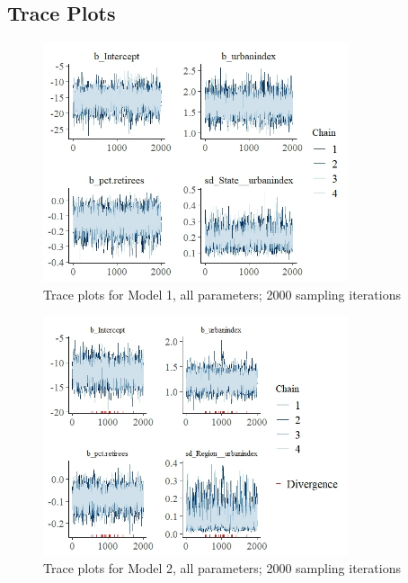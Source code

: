 \documentclass[12pt]{article}
\begin{document}
\clearpage
\FloatBarrier
\subsection*{Trace Plots}

%

\begin{figure}[h!]
	\centering
	\caption{Trace plots for Model 1, all parameters; 2000 sampling iterations}
	\label{fig:trace_mod1_append}
	\includegraphics[width=0.8\textwidth]{trace_plots/trace_model1.jpeg}
\end{figure}


%


\begin{figure}[h!]
	\centering
	\caption{Trace plots for Model 2, all parameters; 2000 sampling iterations}
	\label{fig:trace_mod2_append}
	\includegraphics[width=0.8\textwidth]{trace_plots/trace_model2.jpeg}
\end{figure}
\end{document}
